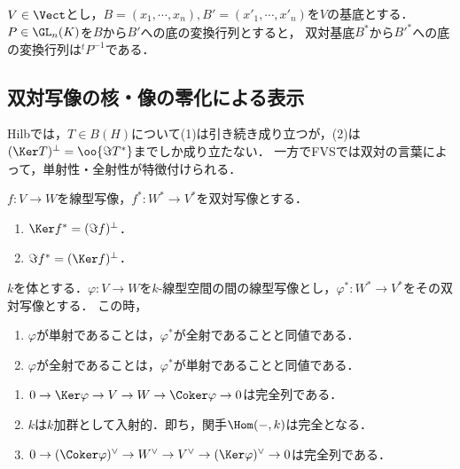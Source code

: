 \documentclass[uplatex, dvipdfmx]{jsreport}
\begin{document}
\begin{corollary}
    $V\in\Vect$とし，$B=(x_1,\cdots,x_n),B'=(x'_1,\cdots,x'_n)$を$V$の基底とする．$P\in\GL_n(K)$を$B$から$B'$への底の変換行列とすると，
    双対基底$B^*$から$B'^*$への底の変換行列は${}^tP^{-1}$である．
\end{corollary}

\subsection{双対写像の核・像の零化による表示}

\begin{tcolorbox}[colframe=ForestGreen, colback=ForestGreen!10!white,breakable,colbacktitle=ForestGreen!40!white,coltitle=black,fonttitle=\bfseries\sffamily,
title=]
    Hilbでは，$T\in B(H)$について(1)は引き続き成り立つが，(2)は$(\Ker T)^\perp=\oo{\Im T^*}$までしか成り立たない．
    一方でFVSでは双対の言葉によって，単射性・全射性が特徴付けられる．
\end{tcolorbox}

\begin{proposition}[双対写像の核と像]\label{prop-dual-map-in-terms-of-annihilator}
    $f:V\to W$を線型写像，$f^*:W^*\to V^*$を双対写像とする．
    \begin{enumerate}
        \item $\Ker f^*=(\Im f)^\bot$．
        \item $\Im f^*=(\Ker f)^\bot$．
    \end{enumerate}
\end{proposition}

\begin{corollary}
    $k$を体とする．$\varphi:V\to W$を$k$-線型空間の間の線型写像とし，$\varphi^*:W^*\to V^*$をその双対写像とする．
    この時，
    \begin{enumerate}
        \item $\varphi$が単射であることは，$\varphi^*$が全射であることと同値である．
        \item $\varphi$が全射であることは，$\varphi^*$が単射であることと同値である．
    \end{enumerate}
\end{corollary}
\begin{Proof}\mbox{}
    \begin{enumerate}
        \item $0\to\Ker\varphi\to V\to W\to\Coker\varphi\to 0$は完全列である．
        \item $k$は$k$加群として入射的．即ち，関手$\Hom(-,k)$は完全となる．
        \item $0\to(\Coker\varphi)^\vee\to W^\vee\to V^\vee\to(\Ker\varphi)^\vee\to 0$は完全列である．
    \end{enumerate}
\end{Proof}
\end{document}
